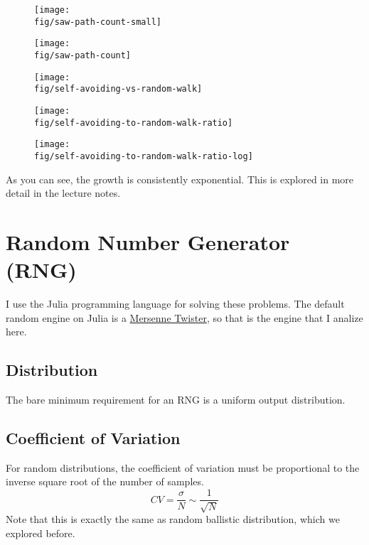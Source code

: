 \documentclass[12pt,a4paper]{article}
\newcommand{\fig}{../fig}
\begin{document}
	\begin{figure}[htb!]
		\centering
		\texttt{[image: \\fig/saw-path-count-small]}
	\end{figure}
	\begin{figure}[htb!]
		\centering
		\texttt{[image: \\fig/saw-path-count]}
	\end{figure}
	\begin{figure}[htb!]
		\centering
		\texttt{[image: \\fig/self-avoiding-vs-random-walk]}
	\end{figure}
	\begin{figure}[htb!]
		\centering
		\texttt{[image: \\fig/self-avoiding-to-random-walk-ratio]}
	\end{figure}
	\begin{figure}[htb!]
		\centering
		\texttt{[image: \\fig/self-avoiding-to-random-walk-ratio-log]}
	\end{figure}
	As you can see, the growth is consistently exponential. This is explored in more detail in the lecture notes.
	
	\restoregeometry
	\section{Random Number Generator (RNG)}
	I use the Julia programming language for solving these problems. The default random engine on Julia is a
	\href{https://en.wikipedia.org/wiki/Mersenne_Twister}{Mersenne Twister}, so that is the engine that I analize here.
	\subsection{Distribution}
	The bare minimum requirement for an RNG is a uniform output distribution.
	\subsection{Coefficient of Variation}
	For random distributions, the coefficient of variation must be proportional to the inverse square root of the
	number of samples.
	\begin{equation}
		CV = \frac{\sigma}{N} \sim \frac{1}{\sqrt{N}}
	\end{equation}
	Note that this is exactly the same as random ballistic distribution, which we explored before.
\end{document}
